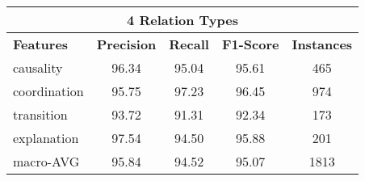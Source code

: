 \begin{table}[ht]
\centering
\begin{tabular}{|l|c|c|c|c|}
\hline

\multicolumn{5}{|c|}{4 Relation Types}                                              \\ \hline
\bf Features            & \bf Precision & \bf Recall & \bf F1-Score & \bf Instances \\ \hline
    causality           &     96.34     &     95.04  &     95.61    &     465       \\ \hline
    coordination        &     95.75     &     97.23  &     96.45    &     974       \\ \hline
    transition          &     93.72     &     91.31  &     92.34    &     173       \\ \hline
    explanation         &     97.54     &     94.50  &     95.88    &     201       \\ \hline
    macro-AVG           &     95.84     &     94.52  &     95.07    &     1813      \\ \hline


\end{tabular}
\end{table}
